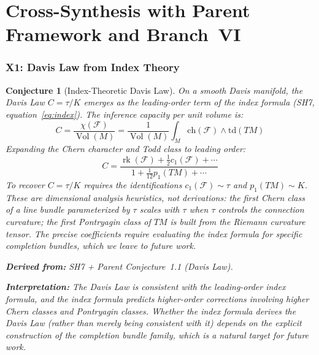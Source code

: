 \documentclass[11pt,letterpaper]{article}
\newtheorem{conjecture}{Conjecture}[section]
\newcommand{\Vol}{\operatorname{Vol}}
\newcommand{\sheaf}{\mathcal{F}}
\DeclareMathOperator{\rk}{rk}
\begin{document}
\newpage
\part{Cross-Synthesis with Parent Framework and Branch~VI}

\section{X1: Davis Law from Index Theory}

\begin{conjecture}[Index-Theoretic Davis 
Law]\label{conj:x_davis_law}
On a smooth Davis manifold, the Davis Law $C = \tau / K$ emerges as 
the leading-order term of the index formula (SH7, 
equation~\eqref{eq:index}). The inference capacity per unit volume is:
\begin{equation}\label{eq:davis_from_index}
    C = \frac{\chi(\sheaf)}{\Vol(M)} = \frac{1}{\Vol(M)} \int_M 
    \mathrm{ch}(\sheaf) \wedge \mathrm{td}(TM)
\end{equation}
Expanding the Chern character and Todd class to leading order:
\begin{equation}\label{eq:davis_leading}
    C = \frac{\rk(\sheaf) + \frac{1}{2}c_1(\sheaf) 
    + \cdots}{1 + \frac{1}{12}p_1(TM) + \cdots}
\end{equation}
To recover $C = \tau / K$ requires the identifications $c_1(\sheaf) 
\sim \tau$ and $p_1(TM) \sim K$. These are \emph{dimensional analysis 
heuristics}, not derivations: the first Chern class of a line bundle 
parameterized by $\tau$ scales with $\tau$ when $\tau$ controls the 
connection curvature; the first Pontryagin class of $TM$ is built from 
the Riemann curvature tensor. The precise coefficients require 
evaluating the index formula for specific completion bundles, which we 
leave to future work.

\textbf{Derived from:} SH7 + Parent Conjecture~1.1 (Davis Law).

\textbf{Interpretation:} The Davis Law is \emph{consistent with} the 
leading-order index formula, and the index formula predicts 
higher-order corrections involving higher Chern classes and 
Pontryagin classes. Whether the index formula \emph{derives} the Davis 
Law (rather than merely being consistent with it) depends on the 
explicit construction of the completion bundle family, which is a 
natural target for future work.
\end{conjecture}
\end{document}
